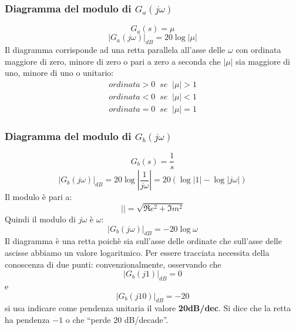 \documentclass[a4paper]{report}
\begin{document}
\subsubsection{Diagramma del modulo di $G_a(j\omega)$}
\[
  G_a(s)=\mu
\]
\begin{displaymath}
  |G_a(j\omega)|_{dB} = 20\log|\mu|
\end{displaymath}
Il diagramma corrisponde ad una retta parallela all'asse delle
$\omega$ con ordinata maggiore di zero, minore di zero o pari a zero a
seconda che $|\mu|$ sia maggiore di uno, minore di uno o unitario:
\[
\begin{array}{l}
  ordinata > 0 \;\; se \;\; |\mu| > 1\\
  ordinata < 0 \;\; se \;\; |\mu| < 1\\
  ordinata = 0 \;\; se \;\; |\mu| = 1
\end{array}
\]

\subsubsection{Diagramma del modulo di $G_b(j \omega)$}
\[
  G_b(s)=\frac{1}{s}
\]
\begin{displaymath}
  |G_b(j\omega)|_{dB} = 20\log\left | \frac{1}{j\omega}\right |  = 20
  (\log |1| - \log |j\omega|)
\end{displaymath}
Il modulo \`e pari a:
\begin{equation}\label{eq:modulo}
  | | =  \sqrt{\Re e^2 + \Im m^2}
\end{equation}
Quindi il modulo di $j \omega$ \`e $\omega$:
\[
  |G_b(j\omega)|_{dB} = -20 \log \omega
\]
Il diagramma \`e una retta poich\`e sia sull'asse delle ordinate che
sull'asse delle ascisse abbiamo un valore logaritmico.
Per essere tracciata necessita della conoscenza di due punti:
convenzionalmente, osservando che 
\[
|G_b(j1)|_{dB} = 0
\]
e
\[
|G_b(j10)|_{dB}=-20
\]
si usa indicare come pendenza unitaria il valore \textbf{20dB/dec}. Si
dice che la retta ha pendenza $-1$ o che ``perde 20 dB/decade''.
\end{document}

